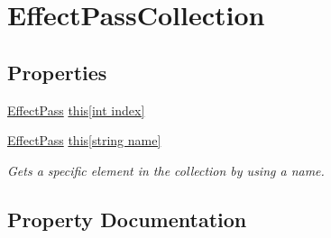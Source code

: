 \hypertarget{classMicrosoft_1_1Xna_1_1Framework_1_1Graphics_1_1EffectPassCollection}{}\section{Effect\+Pass\+Collection}
\label{classMicrosoft_1_1Xna_1_1Framework_1_1Graphics_1_1EffectPassCollection}
\subsection*{Properties}
\begin{DoxyCompactItemize}
\item 
\hyperlink{classMicrosoft_1_1Xna_1_1Framework_1_1Graphics_1_1EffectPass}{Effect\+Pass} \hyperlink{classMicrosoft_1_1Xna_1_1Framework_1_1Graphics_1_1EffectPassCollection_ad734caae9f9a5c42876ae64591f37463}{this\mbox{[}int index\mbox{]}}
\item 
\hyperlink{classMicrosoft_1_1Xna_1_1Framework_1_1Graphics_1_1EffectPass}{Effect\+Pass} \hyperlink{classMicrosoft_1_1Xna_1_1Framework_1_1Graphics_1_1EffectPassCollection_a4d81facc9f5735b8e70df32e0578c9ac}{this\mbox{[}string name\mbox{]}}
\begin{DoxyCompactList}\small\item\em Gets a specific element in the collection by using a name.\end{DoxyCompactList}\end{DoxyCompactItemize}


\subsection{Property Documentation}
\hypertarget{classMicrosoft_1_1Xna_1_1Framework_1_1Graphics_1_1EffectPassCollection_ad734caae9f9a5c42876ae64591f37463}{}
